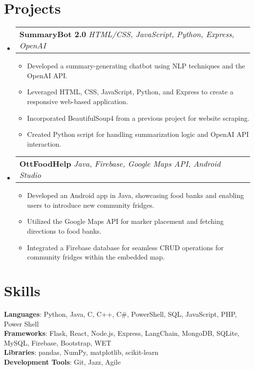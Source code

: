 \documentclass[letterpaper,11pt]{article}
\makeatletter
\newcommand{\resumeItem}[1]{
  \item\small{
    {#1 \vspace{-2pt}}
  }
}
\newcommand{\resumeSubheading}[3]{
    \item
    \begin{tabular*}{0.97\textwidth}[t]{l@{\extracolsep{\fill}}r}
      \textbf{#1} \textbar \textit{ #2} & \textbf{#3} \\
    \end{tabular*}\vspace{-4.5pt}
}
\newcommand{\resumeSubHeadingListStart}{\begin{itemize}[leftmargin=0.15in, label={}]}
\newcommand{\resumeSubHeadingListEnd}{\end{itemize}}
\newcommand{\resumeItemListStart}{\begin{itemize}}
\newcommand{\resumeItemListEnd}{\end{itemize}\vspace{-5pt}}
\makeatother
\begin{document}
\section{\textbf{\Large Projects}}
    \resumeSubHeadingListStart
        \resumeSubheading{SummaryBot 2.0}{HTML/CSS, JavaScript, Python, Express, OpenAI}{}
            \resumeItemListStart
                \resumeItem{Developed a summary-generating chatbot using NLP techniques and the OpenAI API.}
                \resumeItem{Leveraged HTML, CSS, JavaScript, Python, and Express to create a responsive web-based application.}
                \resumeItem{Incorporated BeautifulSoup4 from a previous project for website scraping.}
                \resumeItem{Created Python script for handling summarization logic and OpenAI API interaction.}
            \resumeItemListEnd

        \resumeSubheading{OttFoodHelp}{Java, Firebase, Google Maps API, Android Studio}{}
            \resumeItemListStart
            \resumeItem{Developed an Android app in Java, showcasing food banks and enabling users to introduce new community fridges.}
            \resumeItem{Utilized the Google Maps API for marker placement and fetching directions to food banks.}
                \resumeItem{Integrated a Firebase database for seamless CRUD operations for community fridges within the embedded map.}
            \resumeItemListEnd
        \resumeSubHeadingListEnd

\section{\textbf{\Large Skills}}
 \begin{itemize}[leftmargin=0.15in, label={}]
    \small{\item{
     \textbf{Languages}{: Python, Java, C, C++, C\#, PowerShell, SQL, JavaScript, PHP, Power Shell} \\
     \textbf{Frameworks}{: Flask, React, Node.js, Express, LangChain, MongoDB, SQLite, MySQL, Firebase, Bootstrap, WET} \\
     \textbf{Libraries}{: pandas, NumPy, matplotlib, scikit-learn} \\
     \textbf{Development Tools}{: Git, Jazz, Agile} \\
    }}
 \end{itemize}


\end{document}
